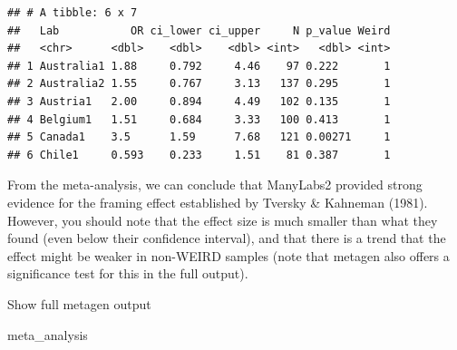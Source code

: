 \documentclass[
]{book}
\newenvironment{Shaded}{\begin{snugshade}}{\end{snugshade}}
\newcommand{\NormalTok}[1]{#1}
\begin{document}
\begin{verbatim}
## # A tibble: 6 x 7
##   Lab           OR ci_lower ci_upper     N p_value Weird
##   <chr>      <dbl>    <dbl>    <dbl> <int>   <dbl> <int>
## 1 Australia1 1.88     0.792     4.46    97 0.222       1
## 2 Australia2 1.55     0.767     3.13   137 0.295       1
## 3 Austria1   2.00     0.894     4.49   102 0.135       1
## 4 Belgium1   1.51     0.684     3.33   100 0.413       1
## 5 Canada1    3.5      1.59      7.68   121 0.00271     1
## 6 Chile1     0.593    0.233     1.51    81 0.387       1
\end{verbatim}

From the meta-analysis, we can conclude that ManyLabs2 provided strong evidence for the framing effect established by Tversky \& Kahneman (1981). However, you should note that the effect size is much smaller than what they found (even below their confidence interval), and that there is a trend that the effect might be weaker in non-WEIRD samples (note that metagen also offers a significance test for this in the full output).

Show full metagen output

\begin{Shaded}
\begin{Highlighting}[]
\NormalTok{meta_analysis}
\end{Highlighting}
\end{Shaded}
\end{document}
